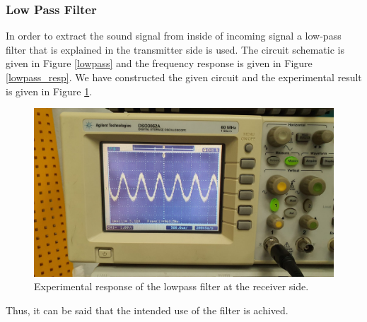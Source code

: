 \documentclass[a4paper,10pt]{IEEEtran}
\begin{document}
\subsubsection{Low Pass Filter}
In order to extract the sound signal from inside of incoming signal a low-pass filter that is explained in the transmitter side is used. The circuit schematic is given in Figure \ref{lowpass} and the frequency response is given in Figure \ref{lowpass_resp}. We have constructed the given circuit and the experimental result is given in Figure \ref{lowpass_osc}.
\begin{figure}[htbp!]
    \centering
    \includegraphics[width = 1\linewidth]{receiver_lowpass_experimental.jpeg}
    \caption{Experimental response of the lowpass filter at the receiver side. }
    \label{lowpass_osc}
\end{figure} 
Thus, it can be said that the intended use of the filter is achived.
\end{document}
